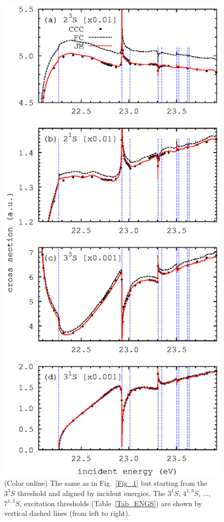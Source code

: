 \documentclass[aip
, pra
, showpacs
, aps
, twocolumn
, groupedaddress
, floatfix
]{revtex4}
\begin{document}
\begin{figure}[htb]
\includegraphics[scale=1]{fig3.ps}
\caption{(Color online)
The same as in Fig.~\ref{Fig_1} but starting from the $3^3S$ threshold
and aligned by incident energies. The $3^1S$, $4^{1,3}S$, ..., $7^{1,3}S$, excitation thresholds (Table~\ref{Tab_ENGS})
are shown by vertical dashed lines (from left to right).
}
\label{Fig_3}
\end{figure}
\end{document}
